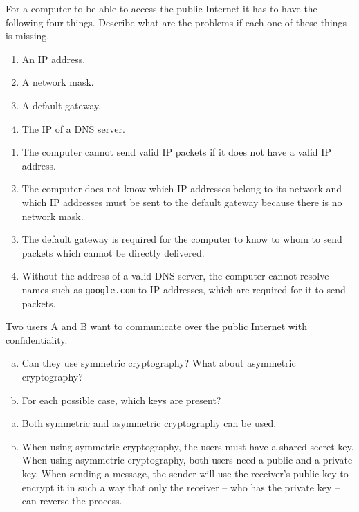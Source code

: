 \begin{Exercise}
For a computer to be able to access the public Internet it has to have the following four things.
Describe what are the problems if each one of these things is missing.
\begin{enumerate}
\item An IP address.
\item A network mask.
\item A default gateway.
\item The IP of a DNS server.
\end{enumerate}
\end{Exercise}
\begin{Answer}
\begin{enumerate}
\item The computer cannot send valid IP packets if it does not have a valid IP address.
\item The computer does not know which IP addresses belong to its network and which IP addresses must be sent to the default gateway because there is no network mask.
\item The default gateway is required for the computer to know to whom to send packets which cannot be directly delivered.
\item Without the address of a valid DNS server, the computer cannot resolve names such as \texttt{google.com} to IP addresses, which are required for it to send packets.
\end{enumerate}
\end{Answer}

\begin{Exercise}
Two users A and B want to communicate over the public Internet with confidentiality.
\begin{enumerate}[a)]
\item Can they use symmetric cryptography? What about asymmetric cryptography?
\item For each possible case, which keys are present?
\end{enumerate}
\end{Exercise}
\begin{Answer}
\begin{enumerate}[a)]
\item Both symmetric and asymmetric cryptography can be used.
\item When using symmetric cryptography, the users must have a shared secret key. When using asymmetric cryptography, both users need a public and a private key.
When sending a message, the sender will use the receiver's public key to encrypt it in such a way that only the receiver -- who has the private key -- can reverse the process.
\end{enumerate}
\end{Answer}

